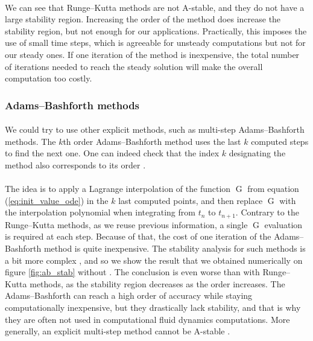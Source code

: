         \paragraph{}
        We can see that Runge--Kutta methods are not A-stable, and they do not have a large stability region.
        Increasing the order of the method does increase the stability region, but not enough for our applications.
        Practically, this imposes the use of small time steps, which is agreeable for unsteady computations but not for our steady ones.
        If one iteration of the method is inexpensive, the total number of iterations needed to reach the steady solution will make the overall computation too costly.


      \subsubsection{Adams--Bashforth methods}

        \paragraph{}
        We could try to use other explicit methods, such as multi-step Adams--Bashforth methods.
        The $k$th order Adams--Bashforth method uses the last $k$ computed steps to find the next one.
        One can indeed check that the index $k$ designating the method also corresponds to its order \cite{HairerNorsettWanner1993}.

        \paragraph{}
        The idea is to apply a Lagrange interpolation of the function $\operatorname{G}$ from equation (\ref{eq:init_value_ode}) in the $k$ last computed points, and then replace $\operatorname{G}$ with the interpolation polynomial when integrating from $t_n$ to $t_{n+1}$.
        Contrary to the Runge--Kutta methods, as we reuse previous information, a single $\operatorname{G}$ evaluation is required at each step.
        Because of that, the cost of one iteration of the Adams--Bashforth method is quite inexpensive.
        The stability analysis for such methods is a bit more complex \cite{HairerNorsettWanner1993, HairerWanner1996}, and so we show the result that we obtained numerically on figure \ref{fig:ab_stab} without .
        The conclusion is even worse than with Runge--Kutta methods, as the stability region decreases as the order increases.
        The Adams--Bashforth can reach a high order of accuracy while staying computationally inexpensive, but they drastically lack stability, and that is why they are often not used in computational fluid dynamics computations.
        More generally, an explicit multi-step method cannot be A-stable \cite{Dahlquist1963}.

